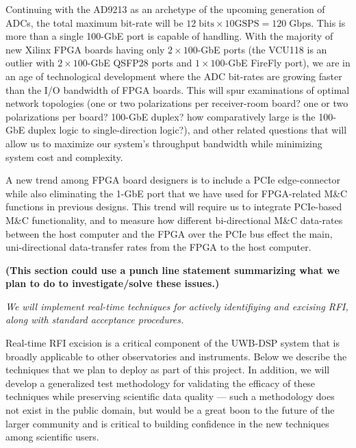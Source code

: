 \documentclass[10pt]{myNSF}
\begin{document}
Continuing with the AD9213 as an archetype of the upcoming generation
of ADCs, the total maximum bit-rate will be $12\; \mathrm{bits} \times
10 \mathrm{GSPS} = 120\; \mathrm{Gbps}$.  This is more than a single
100-GbE port is capable of handling.  With the majority of new Xilinx
FPGA boards having only $2 \times 100$-GbE ports (the VCU118 is an
outlier with $2 \times100$-GbE QSFP28 ports and $1 \times 100$-GbE
FireFly port), we are in an age of technological development where the
ADC bit-rates are growing faster than the I/O bandwidth of FPGA
boards. This will spur examinations of optimal network topologies (one
or two polarizations per receiver-room board? one or two polarizations
per board? 100-GbE duplex? how comparatively large is the 100-GbE
duplex logic to single-direction logic?), and other related questions
that will allow us to maximize our system's throughput bandwidth while
minimizing system cost and complexity.

A new trend among FPGA board designers is to include a PCIe
edge-connector while also eliminating the 1-GbE port that we have used
for FPGA-related M\&C functions in previous designs. This trend will
require us to integrate PCIe-based M\&C functionality, and to measure
how different bi-directional M\&C data-rates between the host computer
and the FPGA over the PCIe bus effect the main, uni-directional
data-transfer rates from the FPGA to the host computer.

\textbf{(This section could use a punch line statement summarizing
  what we plan to do to investigate/solve these issues.)}

\label{sec:rfi_excision}

\emph{We will implement real-time techniques for actively identifiying
  and excising RFI, along with standard acceptance procedures.}

Real-time RFI excision is a critical component of the UWB-DSP system
that is broadly applicable to other observatories and instruments.
Below we describe the techniques that we plan to deploy as part of
this project.  In addition, we will develop a generalized test
methodology for validating the efficacy of these techniques while
preserving scientific data quality --- such a methodology does not
exist in the public domain, but would be a great boon to the future of
the larger community and is critical to building confidence in the new
techniques among scientific users.
\end{document}
